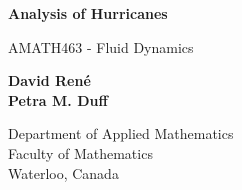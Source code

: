 \begin{titlepage}

\begin{center}
    \vspace*{1cm}
        
    \Huge
    \textbf{Analysis of Hurricanes}
        
    \vspace{0.5cm}
    \LARGE
    AMATH463 - Fluid Dynamics
        
    \vspace{1.5cm}
        
    \textbf{David René}\\
    \textbf{Petra M. Duff} 
    \vfill
        
    \Large
    Department of Applied Mathematics\\
    Faculty of Mathematics\\
    Waterloo, Canada\\
    \date{}
        
\end{center}

\pagebreak

\end{titlepage}